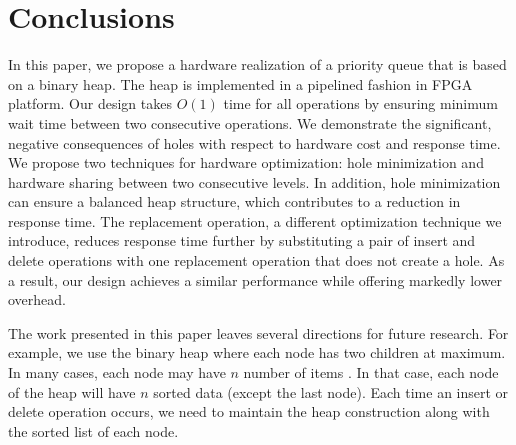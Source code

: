 \section{Conclusions}
\label{s:cons}

In this paper, we propose a hardware realization of a priority queue that is based on a binary heap. 
The heap is implemented in a pipelined fashion in FPGA platform. 
Our design takes $O(1)$ time for all operations by ensuring minimum wait time between two consecutive operations. We demonstrate the significant, negative consequences of holes with respect to hardware cost and response time. 
We propose two techniques for hardware optimization: hole minimization and hardware sharing between two consecutive levels.
In addition, hole minimization can ensure a balanced heap structure, which contributes to a reduction in response time.
The replacement operation, a different optimization technique we introduce, reduces response time further by substituting a pair of insert and delete operations with one replacement operation that does not create a hole.
As a result, our design achieves a similar performance while offering markedly lower overhead.

The work presented in this paper leaves several directions for future research. For example, we use the binary heap where each node has two children at maximum. In many cases, each node may have $n$ number of items \cite{pq3}. In that case, each node of the heap will have $n$ sorted data (except the last node). Each time an insert or delete operation occurs, we need to maintain the heap construction along with the sorted list of each node.

\begin{comment}
The work presented in this paper leaves several directions for the future research. We presented some of these ideas here.
 \begin{itemize}
 \item We used the binary heap where each node has maximum two children. In general, each node may have $n$ number of items \cite{pq3}.
In that case, each node of the heap will have $n$ sorted data (except the last node).
For each time of {\it insert} or {\it delete}, we need to assure heap construction along with the sorted list of each node.
There could be abundant parallelism in operations, but the implementation may incur large overhead.
 \item On-chip memory is limited (32 MB in our case, which means $2^{25}$ nodes can be simulated). To make the design more scalable, we can configure this into FPGA-ARM-core where FPGA is integrated into ARM processor. External RAM can be used, keeping in mind that this would lead slow design for extra memory access time.
 \end{itemize}
\end{comment}
